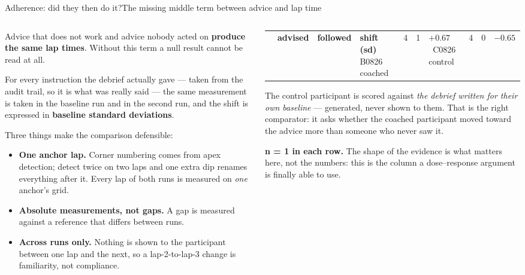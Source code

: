 \documentclass[aspectratio=169,10pt]{beamer}
\newcommand{\kw}[1]{\textcolor{cblue}{\textbf{#1}}}
\newcommand{\good}[1]{\textcolor{cgreen}{#1}}
\newcommand{\bad}[1]{\textcolor{cred}{#1}}
\begin{document}
\begin{frame}{Adherence: did they then do it?}{The missing middle term between advice and lap time}
  \begin{columns}[T]
  \begin{column}{0.52\textwidth}\footnotesize
  Advice that does not work and advice nobody acted on \kw{produce the same lap times}.
  Without this term a null result cannot be read at all.

  \vspace{0.4em}
  For every instruction the debrief actually gave --- taken from the audit trail, so
  it is what was really said --- the same measurement is taken in the baseline run and
  in the second run, and the shift is expressed in \kw{baseline standard deviations}.

  \vspace{0.5em}
  Three things make the comparison defensible:
  \begin{itemize}\scriptsize
    \item \textbf{One anchor lap.} Corner numbering comes from apex detection; detect
      twice on two laps and one extra dip renames everything after it. Every lap of
      both runs is measured on \emph{one} anchor's grid.
    \item \textbf{Absolute measurements, not gaps.} A gap is measured against a
      reference that differs between runs.
    \item \textbf{Across runs only.} Nothing is shown to the participant between one
      lap and the next, so a lap-2-to-lap-3 change is familiarity, not compliance.
    \end{itemize}
  \end{column}
  \begin{column}{0.48\textwidth}
  \vspace{0.3em}
  \begin{center}\footnotesize
  \begin{tabular}{@{}lR{1.3cm}R{1.3cm}R{1.5cm}@{}}
    \toprule
    & \textbf{advised} & \textbf{followed} & \textbf{shift (sd)} \
    \midrule
    B0826 coached & 4 & 1 & \good{$+0.67$} \
    C0826 control & 4 & 0 & \bad{$-0.65$} \
    \bottomrule
  \end{tabular}
  \end{center}
  \vspace{0.5em}
  {\footnotesize
  The control participant is scored against \emph{the debrief written for their own
  baseline} --- generated, never shown to them. That is the right comparator: it asks
  whether the coached participant moved toward the advice more than someone who
  never saw it.

  \vspace{0.4em}
  \kw{n = 1 in each row.} The shape of the evidence is what matters here, not the
  numbers: this is the column a dose--response argument is finally able to use.}
  \end{column}
  \end{columns}
\end{frame}
\end{document}
